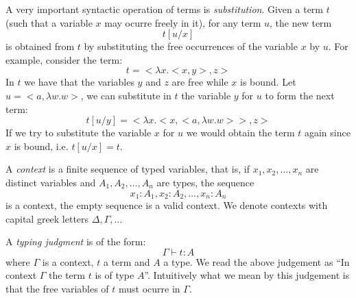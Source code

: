 A very important syntactic operation of terms is \emph{substitution}. Given a term $t$ (such that a variable $x$ may ocurre freely in it), for any term $u$, the new term
\[
t[u/x]
\]
is obtained from $t$ by substituting the free occurrences of the variable $x$ by $u$. For example, consider the term:
\[
t = <\lambda x.<x, y> , z>
\]
In $t$ we have that the variables $y$ and $z$ are free while $x$ is bound. Let $u = <a , \lambda w.w>$, we can substitute in $t$ the variable $y$ for $u$ to form the next term:
\[
t[u/y] = <\lambda x.<x, <a, \lambda w.w>> , z>
\]
If we try to substitute the variable $x$ for $u$ we would obtain the term $t$ again since $x$ is bound, i.e. $t[u/x] = t$.

A \emph{context} is a finite sequence of typed variables, that is, if $x_1, x_2, \dots , x_n$ are distinct variables and $A_1, A_2, \dots , A_n$ are types, the sequence 
\[
x_1 : A_1 , x_2 : A_2 , \dots , x_n : A_n
\]  
is a context, the empty sequence is a valid context. We denote contexts with capital greek letters $\Delta, \Gamma, \dots$

A \emph{typing judgment} is of the form:
\[
\Gamma \vdash t:A
\]
where $\Gamma$ is a context, $t$ a term and $A$ a type. We read the above judgement as ``In context $\Gamma$ the term $t$ is of type $A$''. Intuitively what we mean by this judgement is that the free variables of $t$ must ocurre in $\Gamma$.

